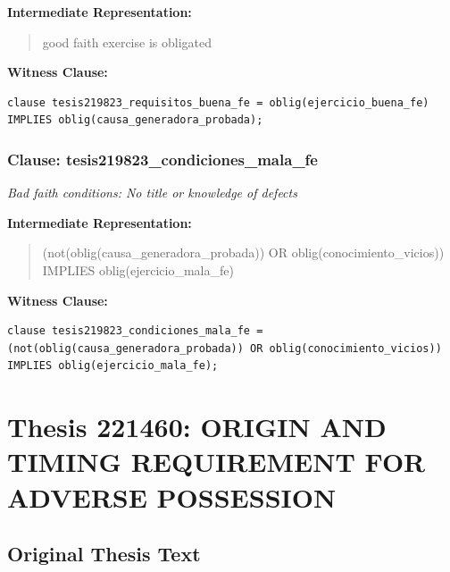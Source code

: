 \documentclass[11pt,a4paper]{article}
\begin{document}
\textbf{Intermediate Representation:}

\begin{quote}
good faith exercise is obligated
\end{quote}

\textbf{Witness Clause:}

\begin{lstlisting}[style=witnessstyle, language=Witness]
clause tesis219823_requisitos_buena_fe = oblig(ejercicio_buena_fe) IMPLIES oblig(causa_generadora_probada);
\end{lstlisting}

\subsubsection{Clause: tesis219823\_condiciones\_mala\_fe}

\textit{Bad faith conditions: No title or knowledge of defects}

\textbf{Intermediate Representation:}

\begin{quote}
(not(oblig(causa\_generadora\_probada)) OR oblig(conocimiento\_vicios)) IMPLIES oblig(ejercicio\_mala\_fe)
\end{quote}

\textbf{Witness Clause:}

\begin{lstlisting}[style=witnessstyle, language=Witness]
clause tesis219823_condiciones_mala_fe = (not(oblig(causa_generadora_probada)) OR oblig(conocimiento_vicios)) IMPLIES oblig(ejercicio_mala_fe);
\end{lstlisting}

\newpage

\section{Thesis 221460: ORIGIN AND TIMING REQUIREMENT FOR ADVERSE POSSESSION}
\label{thesis:221460}

\subsection{Original Thesis Text}
\end{document}

